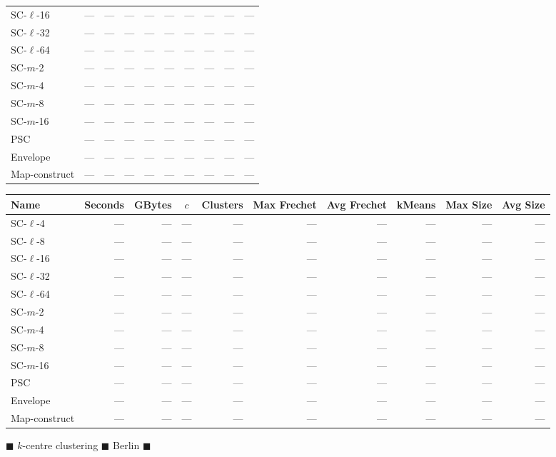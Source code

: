 \begin{figure}
\begin{center}
\begin{minipage}{\textwidth}
{\begin{tabular}{@{}lrrcrrrrrr@{}}
        SC-$\ell$-16 & --- & --- & --- & --- & --- & --- & --- & --- & ---\\
        SC-$\ell$-32 & --- & --- & --- & --- & --- & --- & --- & --- & ---\\
        SC-$\ell$-64 & --- & --- & --- & --- & --- & --- & --- & --- & ---\\
        SC-$m$-2 & --- & --- & --- & --- & --- & --- & --- & --- & ---\\
        SC-$m$-4 & --- & --- & --- & --- & --- & --- & --- & --- & ---\\
        SC-$m$-8 & --- & --- & --- & --- & --- & --- & --- & --- & ---\\
        SC-$m$-16 & --- & --- & --- & --- & --- & --- & --- & --- & ---\\
        PSC & --- & --- & --- & --- & --- & --- & --- & --- & ---\\
        Envelope & --- & --- & --- & --- & --- & --- & --- & --- & ---\\
        Map-construct & --- & --- & --- & --- & --- & --- & --- & --- & ---\\
        \bottomrule
    \end{tabular}
    }
    {
    \begin{tabular}{@{}lrrcrrrrrr@{}}
        \toprule
        Name & Seconds & GBytes & $c$ & Clusters & Max Frechet & Avg Frechet & kMeans & Max Size & Avg Size\\
        \midrule
        SC-$\ell$-4 & --- & --- & --- & --- & --- & --- & --- & --- & ---\\
        SC-$\ell$-8 & --- & --- & --- & --- & --- & --- & --- & --- & ---\\
        SC-$\ell$-16 & --- & --- & --- & --- & --- & --- & --- & --- & ---\\
        SC-$\ell$-32 & --- & --- & --- & --- & --- & --- & --- & --- & ---\\
        SC-$\ell$-64 & --- & --- & --- & --- & --- & --- & --- & --- & ---\\
        SC-$m$-2 & --- & --- & --- & --- & --- & --- & --- & --- & ---\\
        SC-$m$-4 & --- & --- & --- & --- & --- & --- & --- & --- & ---\\
        SC-$m$-8 & --- & --- & --- & --- & --- & --- & --- & --- & ---\\
        SC-$m$-16 &--- & --- & --- & --- & --- & --- & --- & --- & ---\\
        PSC & --- & --- & --- & --- & --- & --- & --- & --- & ---\\
        Envelope & --- & --- & --- & --- & --- & --- & --- & --- & ---\\
        Map-construct & --- & --- & --- & --- & --- & --- & --- & --- & ---\\
        \bottomrule
    \end{tabular}
    }
    \end{minipage}
%
        \caption{$\blacksquare$ $k$-centre clustering $\blacksquare$ Berlin   $\blacksquare$}
    \end{center} \end{figure}
